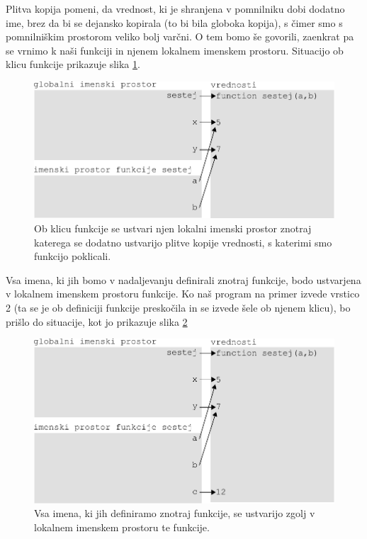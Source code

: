 Plitva kopija pomeni, da vrednost, ki je shranjena v pomnilniku dobi dodatno ime, brez da bi se dejansko kopirala (to bi bila globoka kopija), s čimer smo s pomnilniškim prostorom veliko bolj varčni. O tem bomo še govorili, zaenkrat pa se vrnimo k naši funkciji in njenem lokalnem imenskem prostoru. Situacijo ob klicu funkcije prikazuje slika \ref{img:imenski_prostor_3}.
\begin{figure}
    \centering
    \includegraphics[width=\linewidth]{img/imenski_prostor_3.pdf}
    \caption{Ob klicu funkcije se ustvari njen lokalni imenski prostor znotraj katerega se dodatno ustvarijo plitve kopije vrednosti, s katerimi smo funkcijo poklicali.}
    \label{img:imenski_prostor_3}
\end{figure}
Vsa imena, ki jih bomo v nadaljevanju definirali znotraj funkcije, bodo ustvarjena v lokalnem imenskem prostoru funkcije. Ko naš program na primer izvede vrstico 2 (ta se je ob definiciji funkcije preskočila in se izvede šele ob njenem klicu), bo prišlo do situacije, kot jo prikazuje slika \ref{img:imenski_prostor_4}
\begin{figure}
    \centering
    \includegraphics[width=\linewidth]{img/imenski_prostor_4.pdf}
    \caption{Vsa imena, ki jih definiramo znotraj funkcije, se ustvarijo zgolj v lokalnem imenskem prostoru te funkcije.}
    \label{img:imenski_prostor_4}
\end{figure}
